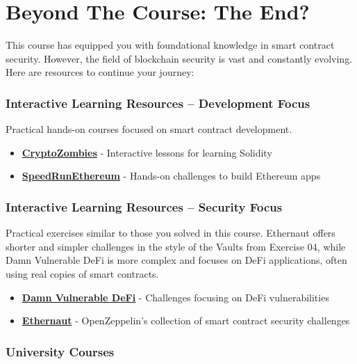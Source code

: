 \documentclass[12pt]{article}
\begin{document}
\section{Beyond The Course: The End?}

This course has equipped you with foundational knowledge in smart contract
security. However, the field of blockchain security is vast and constantly
evolving. Here are resources to continue your journey:

\subsubsection*{Interactive Learning Resources -- Development Focus}

Practical hands-on courses focused on smart contract development.

\begin{itemize}
    \item \textbf{\href{https://cryptozombies.io/}{CryptoZombies}} - Interactive lessons for learning Solidity
    \item \textbf{\href{https://speedrunethereum.com/}{SpeedRunEthereum}} - Hands-on challenges to build Ethereum apps
\end{itemize}

\subsubsection*{Interactive Learning Resources -- Security Focus}

Practical exercises similar to those you solved in this course. Ethernaut offers shorter and simpler challenges in the style of the Vaults from Exercise 04, while Damn Vulnerable DeFi is more complex and focuses on DeFi applications, often using real copies of smart contracts.

\begin{itemize}
    \item \textbf{\href{https://www.damnvulnerabledefi.xyz/}{Damn Vulnerable DeFi}} - Challenges focusing on DeFi vulnerabilities
    \item \textbf{\href{https://ethernaut.openzeppelin.com/}{Ethernaut}} - OpenZeppelin's collection of smart contract security challenges
\end{itemize}

\subsubsection*{University Courses}
\end{document}
